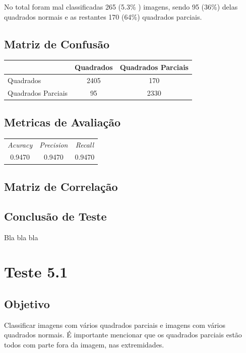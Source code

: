No total foram mal classificadas 265 (5.3\% ) imagens, sendo 95 (36\%) delas quadrados normais e as restantes 170 (64\%) quadrados parciais. 

\subsection{Matriz de Confusão}

\begin{table}[H]
\centering
\begin{tabular}{l|c c}
                   & Quadrados & Quadrados Parciais \\
\hline
Quadrados          & 2405         & 170                  \\
Quadrados Parciais & 95           & 2330                  \\
\end{tabular}
\end{table}

\subsection{Metricas de Avaliação}

\begin{table}[H]
\centering
\begin{tabular}{|c|c|c|}
\textit{Acuracy} & \textit{Precision} & \textit{Recall} \\
0.9470 & 0.9470 & 0.9470  \\
\end{tabular}
\end{table}

\subsection{Matriz de Correlação}

\subsection{Conclusão de Teste}
    Bla bla bla


\section{Teste 5.1}
\subsection{Objetivo}
Classificar imagens com vários quadrados parciais e imagens com vários quadrados normais. É importante mencionar que os quadrados parciais estão todos com parte fora da imagem, nas extremidades. 
